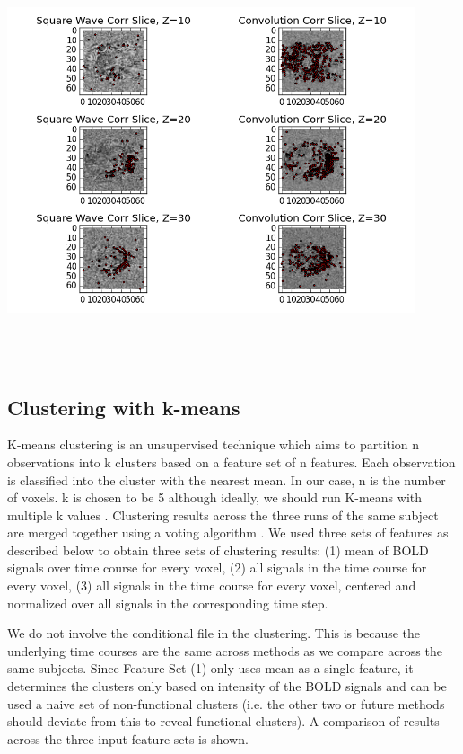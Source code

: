 \documentclass[11pt]{article}
\begin{document}
\centering
\includegraphics[width=12cm, height=12cm]{compare_correlations.png}


\subsection{Clustering with k-means}

K-means clustering is an unsupervised technique which aims to partition n
observations into k clusters based on a feature set of n features. Each
observation is classified into the cluster with the nearest mean. In our case, 
n
is the number of voxels. k is chosen to be 5 although ideally, we should run
K-means with multiple k values \cite{venkataraman2009}. Clustering results
across the three runs of the same subject are merged together using a voting
algorithm \cite{dimitriadou2002}. We used three sets of features as described
below to obtain three sets of clustering results: (1) mean of BOLD signals over
time course for every voxel, (2) all signals in the time course for every 
voxel,
(3) all signals in the time course for every voxel, centered and normalized 
over
all signals in the corresponding time step. 

We do not involve the conditional file in the clustering. This is because the
underlying time courses are the same across methods as we compare across the
same subjects. Since Feature Set (1) only uses mean as a single feature, it
determines the clusters only based on intensity of the BOLD signals and can be
used a naive set of non-functional clusters (i.e. the other two or future
methods should deviate from this to reveal functional clusters). A comparison 
of
results across the three input feature sets is shown.
\end{document}
